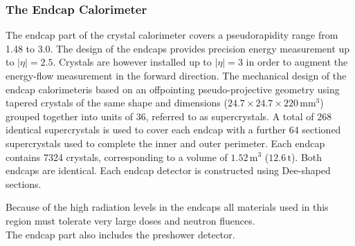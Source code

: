\subsubsection{The Endcap Calorimeter}
The endcap part of the crystal calorimeter covers a pseudorapidity range from 1.48 to 3.0. The design of the endcaps provides precision energy measurement up to $|\eta| = 2.5$. Crystals are however installed up to $|\eta| = 3$ in order to augment the energy-flow measurement in the forward direction.  The mechanical design of the endcap calorimeteris based on an offpointing pseudo-projective geometry using tapered crystals of the same shape and dimensions ($24.7 \times 24.7 \times 220 \,$mm$^3$) grouped together into units of $36$, referred to as supercrystals. A total of $268$ identical supercrystals is used to cover each endcap with a further $64$ sectioned supercrystals used to complete the inner and outer perimeter. Each endcap contains 7324 crystals, corresponding to a volume of $1.52 \,$m$^3$ ($12.6 \,$t). Both endcaps are identical. Each endcap detector is constructed using Dee-shaped sections.

Because of the high radiation levels in the endcaps all materials used in this region must tolerate very large doses and neutron fluences.  \\
The endcap part also includes the preshower detector. 


